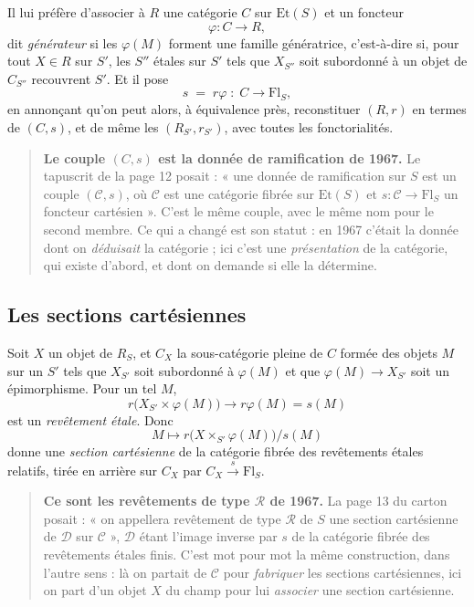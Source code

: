 \documentclass[11pt,a4paper]{article}
\begin{document}
Il lui préfère d'associer à $R$ une catégorie $C$ sur $\mathrm{Et}(S)$ et un
foncteur
\[
  \varphi : C \longrightarrow R ,
\]
dit \emph{générateur} si les $\varphi(M)$ forment une famille génératrice,
c'est-à-dire si, pour tout $X \in R$ sur $S'$, les $S''$ étales sur $S'$ tels
que $X_{S''}$ soit subordonné à un objet de $C_{S''}$ recouvrent $S'$. Et il
pose
\[
  s \;=\; r\varphi \;:\; C \longrightarrow \mathrm{Fl}_{S} ,
\]
en annonçant qu'on peut alors, à équivalence près, reconstituer $(R, r)$ en
termes de $(C, s)$, et de même les $(R_{S'}, r_{S'})$, avec toutes les
fonctorialités.

\begin{quote}
\textbf{Le couple $(C, s)$ est la donnée de ramification de 1967.} Le tapuscrit
de la page 12 posait : « une donnée de ramification sur $S$ est un couple
$(\mathcal{C}, s)$, où $\mathcal{C}$ est une catégorie fibrée sur
$\mathrm{Et}(S)$ et $s : \mathcal{C} \to \mathrm{Fl}_{S}$ un foncteur
cartésien ». C'est le même couple, avec le même nom pour le second membre. Ce
qui a changé est son statut : en 1967 c'était la donnée dont on \emph{déduisait}
la catégorie ; ici c'est une \emph{présentation} de la catégorie, qui existe
d'abord, et dont on demande si elle la détermine.
\end{quote}

\subsection*{Les sections cartésiennes}

Soit $X$ un objet de $R_{S}$, et $C_{X}$ la sous-catégorie pleine de $C$ formée
des objets $M$ sur un $S'$ tels que $X_{S'}$ soit subordonné à $\varphi(M)$ et
que $\varphi(M) \to X_{S'}$ soit un épimorphisme. Pour un tel $M$,
\[
  r\bigl(X_{S'} \times \varphi(M)\bigr) \longrightarrow r\varphi(M) = s(M)
\]
est un \emph{revêtement étale}. Donc
\[
  M \longmapsto r\bigl(X \times_{S'} \varphi(M)\bigr) \big/ s(M)
\]
donne une \emph{section cartésienne} de la catégorie fibrée des revêtements
étales relatifs, tirée en arrière sur $C_{X}$ par
$C_{X} \xrightarrow{\ s\ } \mathrm{Fl}_{S}$.

\begin{quote}
\textbf{Ce sont les revêtements de type $\mathcal{R}$ de 1967.} La page 13 du
carton posait : « on appellera revêtement de type $\mathcal{R}$ de $S$ une
section cartésienne de $\mathcal{D}$ sur $\mathcal{C}$ », $\mathcal{D}$ étant
l'image inverse par $s$ de la catégorie fibrée des revêtements étales finis.
C'est mot pour mot la même construction, dans l'autre sens : là on partait de
$\mathcal{C}$ pour \emph{fabriquer} les sections cartésiennes, ici on part d'un
objet $X$ du champ pour lui \emph{associer} une section cartésienne.
\end{quote}
\end{document}
